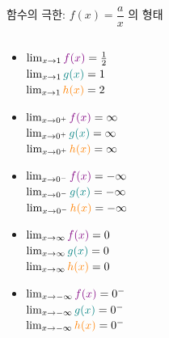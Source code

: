 \documentclass[aspectratio=169]{beamer}
\begin{document}
\begin{frame}{함수의 극한: $f(x) = \dfrac{a}{x}$ 의 형태}
\begin{columns}
    \begin{column}{0.45\textwidth}
      \begin{itemize}
        \item $\lim_{x \to 1} \textcolor{violet}{f(x)} = \frac{1}{2}$ \\
              $\lim_{x \to 1} \textcolor{teal}{g(x)} = 1$ \\
              $\lim_{x \to 1} \textcolor{orange}{h(x)} = 2$
        \item $\lim_{x \to 0^+} \textcolor{violet}{f(x)} = \infty $ \\
              $\lim_{x \to 0^+} \textcolor{teal}{g(x)} = \infty $ \\
              $\lim_{x \to 0^+} \textcolor{orange}{h(x)} = \infty $
        \item $\lim_{x \to 0^-} \textcolor{violet}{f(x)} = -\infty $ \\
              $\lim_{x \to 0^-} \textcolor{teal}{g(x)} = -\infty $ \\
              $\lim_{x \to 0^-} \textcolor{orange}{h(x)} = -\infty $
        \item $\lim_{x \to \infty} \textcolor{violet}{f(x)} = 0 $ \\
              $\lim_{x \to \infty} \textcolor{teal}{g(x)} = 0 $ \\
              $\lim_{x \to \infty} \textcolor{orange}{h(x)} = 0 $
        \item $\lim_{x \to -\infty} \textcolor{violet}{f(x)} = 0^- $ \\
              $\lim_{x \to -\infty} \textcolor{teal}{g(x)} = 0^- $ \\
              $\lim_{x \to -\infty} \textcolor{orange}{h(x)} = 0^- $
      \end{itemize}
    \end{column}
  \end{columns}
\end{frame}
\end{document}
